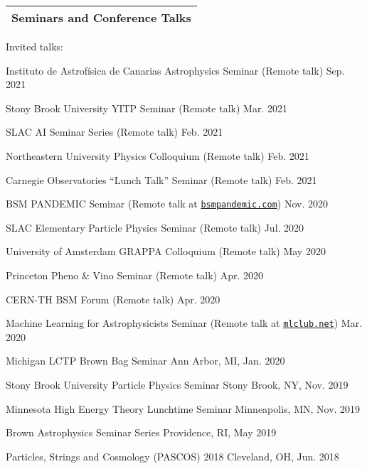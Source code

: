 \documentclass[11pt]{article}
\newenvironment{packed_itemize}{
\begin{itemize}[label=\raisebox{0.25ex}{\tiny$\bullet$}]
  \setlength{\itemsep}{3pt}
  \setlength{\parskip}{0pt}
  \setlength{\parsep}{0pt}}{\end{itemize}
}
\begin{document}


\noindent
\begin{tabular*}{\textwidth}{l@{\extracolsep{\fill}}}
\large {\sc \Large{Seminars and Conference Talks}}\\
\hline
\end{tabular*}\vspace{3.5mm}

\noindent
Invited talks:
\begin{packed_itemize}
  \item Instituto de Astrof\'{i}sica de Canarias Astrophysics Seminar (Remote talk) \hfill Sep. 2021
  \item Stony Brook University YITP Seminar (Remote talk) \hfill Mar. 2021
  \item SLAC AI Seminar Series (Remote talk) \hfill Feb. 2021
  \item Northeastern University Physics Colloquium (Remote talk) \hfill Feb. 2021
  \item Carnegie Observatories ``Lunch Talk'' Seminar (Remote talk) \hfill Feb. 2021
  \item BSM PANDEMIC Seminar  (Remote talk at \href{https://www.bsmpandemic.com/ }{\texttt{bsmpandemic.com}}) \hfill Nov. 2020
  \item SLAC Elementary Particle Physics Seminar (Remote talk) \hfill Jul. 2020
  \item University of Amsterdam GRAPPA Colloquium (Remote talk) \hfill May 2020
  \item Princeton Pheno \& Vino Seminar (Remote talk) \hfill Apr. 2020
  \item CERN-TH BSM Forum (Remote talk) \hfill  Apr. 2020
  \item Machine Learning for Astrophysicists Seminar (Remote talk at \href{https://docs.google.com/document/d/1GGtE-YIuAWlmpKSr38_kyiF-Fklszhkh4FkiYWzBAho/pub}{\texttt{mlclub.net}}) \hfill  Mar. 2020
  \item Michigan LCTP Brown Bag Seminar \hfill Ann Arbor, MI, Jan. 2020
  \item Stony Brook University Particle Physics Seminar \hfill Stony Brook, NY, Nov. 2019
  \item Minnesota High Energy Theory Lunchtime Seminar \hfill  Minneapolis, MN, Nov. 2019
  \item Brown Astrophysics Seminar Series \hfill Providence, RI, May 2019
  \item Particles, Strings and Cosmology (PASCOS) 2018 \hfill Cleveland, OH, Jun. 2018

\end{packed_itemize}
\end{document}
